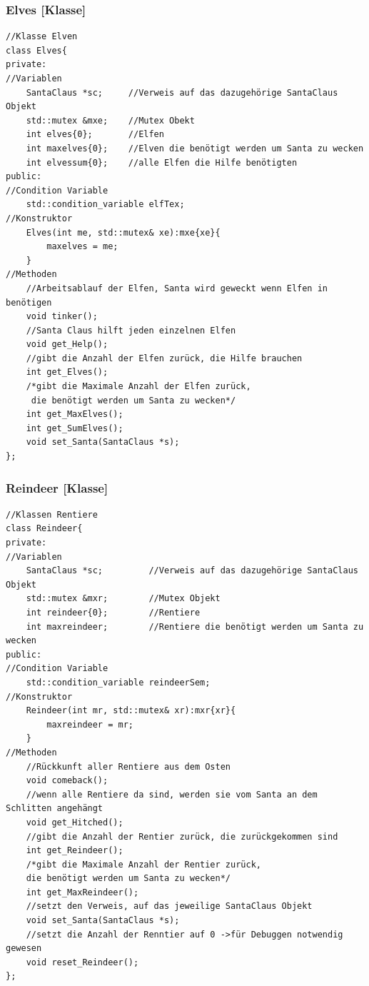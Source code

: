 \documentclass[a4paper,12pt]{article}
\begin{document}
\subsubsection{Elves [Klasse]}
\begin{verbatim}
//Klasse Elven
class Elves{
private:
//Variablen
    SantaClaus *sc;     //Verweis auf das dazugehörige SantaClaus Objekt
    std::mutex &mxe;    //Mutex Obekt
    int elves{0};       //Elfen
    int maxelves{0};    //Elven die benötigt werden um Santa zu wecken
    int elvessum{0};    //alle Elfen die Hilfe benötigten 
public:
//Condition Variable
    std::condition_variable elfTex;
//Konstruktor
    Elves(int me, std::mutex& xe):mxe{xe}{
        maxelves = me;
    }
//Methoden
    //Arbeitsablauf der Elfen, Santa wird geweckt wenn Elfen in benötigen
    void tinker();
    //Santa Claus hilft jeden einzelnen Elfen
    void get_Help();
    //gibt die Anzahl der Elfen zurück, die Hilfe brauchen
    int get_Elves();
    /*gibt die Maximale Anzahl der Elfen zurück,
     die benötigt werden um Santa zu wecken*/
    int get_MaxElves();
    int get_SumElves();
    void set_Santa(SantaClaus *s);
};
\end{verbatim}

\subsubsection{Reindeer [Klasse]}
\begin{verbatim}
//Klassen Rentiere
class Reindeer{
private:
//Variablen
    SantaClaus *sc;         //Verweis auf das dazugehörige SantaClaus Objekt
    std::mutex &mxr;        //Mutex Objekt
    int reindeer{0};        //Rentiere
    int maxreindeer;        //Rentiere die benötigt werden um Santa zu wecken
public:
//Condition Variable
    std::condition_variable reindeerSem;
//Konstruktor
    Reindeer(int mr, std::mutex& xr):mxr{xr}{
        maxreindeer = mr;
    }    
//Methoden
    //Rückkunft aller Rentiere aus dem Osten
    void comeback();
    //wenn alle Rentiere da sind, werden sie vom Santa an dem Schlitten angehängt
    void get_Hitched();
    //gibt die Anzahl der Rentier zurück, die zurückgekommen sind
    int get_Reindeer();
    /*gibt die Maximale Anzahl der Rentier zurück, 
    die benötigt werden um Santa zu wecken*/
    int get_MaxReindeer();
    //setzt den Verweis, auf das jeweilige SantaClaus Objekt
    void set_Santa(SantaClaus *s);
    //setzt die Anzahl der Renntier auf 0 ->für Debuggen notwendig gewesen
    void reset_Reindeer();
};
\end{verbatim}
\end{document}
